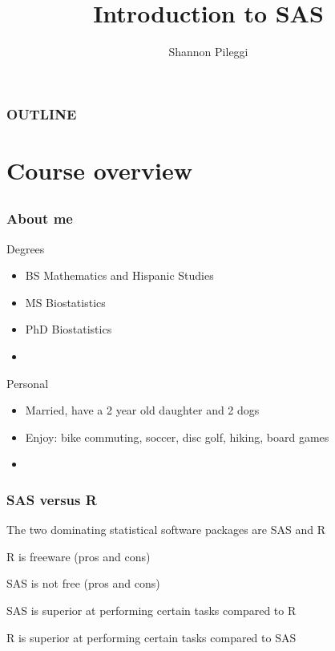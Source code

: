 





\title[Lecture 1]{Introduction to SAS}
\author[Pileggi]{Shannon Pileggi}


\date{}




\begin{frame}
\titlepage
\end{frame}

\begin{frame}
\frametitle{OUTLINE\qquad\qquad\qquad} \tableofcontents[hideallsubsections]
\end{frame}


\section[Course overview]{Course overview}

\subsection{}

\begin{frame}
\frametitle{About me}
Degrees
\begin{itemize}
\item BS Mathematics and Hispanic Studies
\item MS Biostatistics
\item PhD Biostatistics
\item[]
\end{itemize}

Personal
\begin{itemize}
\item Married, have a 2 year old daughter and 2 dogs
\item Enjoy: bike commuting, soccer, disc golf, hiking, board games
\item[]
\end{itemize}
\end{frame}

\begin{frame}
\frametitle{SAS versus R}
\bi
\item The two dominating statistical software packages are SAS and R
	\bi
	\item R is freeware (pros and cons)
	\item SAS is not free (pros and cons)
	\ei
\item SAS is superior at performing certain tasks compared to R
\item R is superior at performing certain tasks compared to SAS
\ei
\end{frame}

